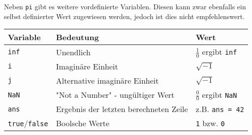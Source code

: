                 \noindent Neben \texttt{pi} gibt es weitere vordefinierte Variablen. Diesen kann zwar ebenfalls ein selbst definierter Wert zugewiesen werden, jedoch ist dies nicht empfehlenswert.
                \begin{center}
                \renewcommand{\arraystretch}{1.4}
                \begin{tabularx}{\textwidth}{|l| X| l|}
                    \hline
                    \textbf{Variable} & \textbf{Bedeutung} & \textbf{Wert} \\
                    \hline
                    \texttt{inf} & Unendlich & $\frac{1}{0}$ ergibt \texttt{inf} \\
                    \hline
                    \texttt{i} & Imaginäre Einheit & $\sqrt{-1}$ \\
                    \hline
                    \texttt{j} & Alternative imaginäre Einheit & $\sqrt{-1}$ \\
                    \hline
                    \texttt{NaN} & "Not a Number" - ungültiger Wert & $\frac{0}{0}$ ergibt \texttt{NaN} \\
                    \hline
                    \texttt{ans} & Ergebnis der letzten berechneten Zeile & z.B. \texttt{ans = 42} \\
                    \hline
                    \texttt{true}/\texttt{false} & Boolsche Werte & \texttt{1} bzw. \texttt{0} \\
                    \hline
                \end{tabularx}
            \end{center}
